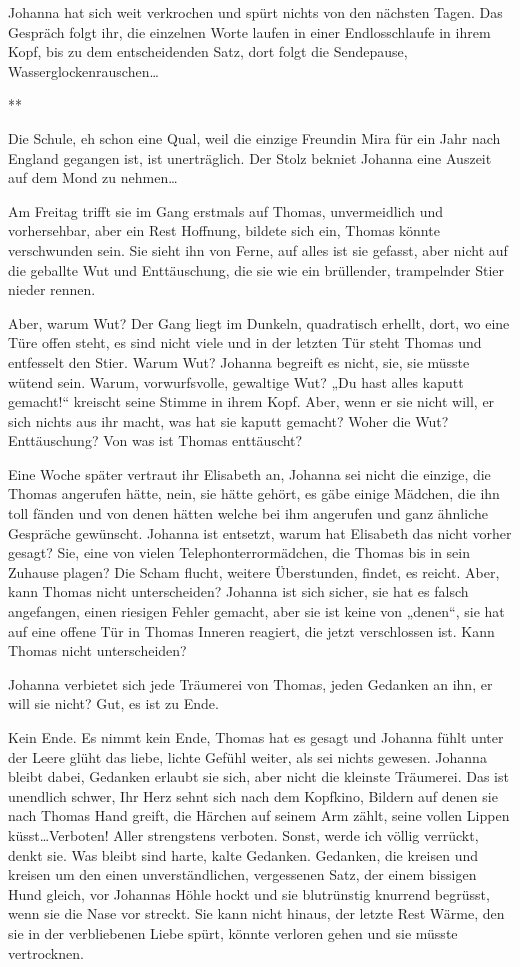 \documentclass[10pt,titlepage,a5paper]{book}
\newcommand{\sterne}{\par{\centering ***\par}}
\begin{document}
Johanna hat sich weit verkrochen und spürt nichts von den nächsten Tagen. Das Gespräch folgt ihr, die einzelnen Worte laufen in einer Endlosschlaufe in ihrem Kopf, bis zu dem entscheidenden Satz, dort folgt die Sendepause, Wasserglockenrauschen\dots 


\sterne


Die Schule, eh schon eine Qual, weil die einzige Freundin Mira für ein Jahr nach England gegangen ist, ist unerträglich. Der Stolz bekniet Johanna eine Auszeit auf dem Mond zu nehmen\dots 

Am Freitag trifft sie im Gang erstmals auf Thomas, unvermeidlich und vorhersehbar, aber ein Rest Hoffnung, bildete sich ein, Thomas könnte verschwunden sein. Sie sieht ihn von Ferne, auf alles ist sie gefasst, aber nicht auf die geballte Wut und Enttäuschung, die sie wie ein brüllender, trampelnder Stier nieder rennen. 

Aber, warum Wut? Der Gang liegt im Dunkeln, quadratisch erhellt, dort, wo eine Türe offen steht, es  sind nicht viele und in der letzten Tür steht Thomas und entfesselt den Stier. Warum Wut? Johanna begreift es nicht, sie, sie müsste wütend sein. Warum, vorwurfsvolle, gewaltige Wut? „Du hast alles kaputt gemacht!“ kreischt seine Stimme in ihrem Kopf. Aber, wenn er sie nicht will, er sich nichts aus ihr macht, was hat sie kaputt gemacht? Woher die Wut? Enttäuschung? Von was ist Thomas enttäuscht?

Eine Woche später vertraut ihr Elisabeth an, Johanna sei nicht die einzige, die Thomas angerufen hätte, nein, sie hätte gehört, es gäbe einige Mädchen, die ihn toll fänden und von denen hätten welche bei ihm angerufen und ganz ähnliche Gespräche gewünscht. Johanna ist entsetzt, warum hat Elisabeth das nicht vorher gesagt? Sie, eine von vielen Telephonterrormädchen, die Thomas bis in sein Zuhause plagen? Die Scham flucht, weitere Überstunden, findet, es reicht. Aber, kann Thomas nicht unterscheiden? Johanna ist sich sicher, sie hat es falsch angefangen, einen riesigen Fehler gemacht, aber sie ist keine von „denen“, sie hat auf eine offene Tür in Thomas Inneren reagiert, die jetzt verschlossen ist. Kann Thomas nicht unterscheiden?

Johanna verbietet sich jede Träumerei von Thomas, jeden Gedanken an ihn, er will sie nicht? Gut, es ist zu Ende.

Kein Ende. Es nimmt kein Ende, Thomas hat es gesagt und Johanna fühlt unter der Leere glüht das liebe, lichte Gefühl weiter, als sei nichts gewesen. Johanna bleibt dabei, Gedanken erlaubt sie sich, aber nicht die kleinste Träumerei. Das ist unendlich schwer, Ihr Herz sehnt sich nach dem Kopfkino, Bildern auf denen sie nach Thomas Hand greift, die Härchen auf seinem Arm zählt, seine vollen Lippen küsst\dots Verboten! Aller strengstens verboten. Sonst, werde ich völlig verrückt, denkt sie.
Was bleibt sind harte, kalte Gedanken. Gedanken, die kreisen und kreisen um den einen unverständ\-lichen, vergessenen Satz, der einem bissigen Hund gleich, vor Johannas Höhle hockt und sie blutrünstig knurrend begrüsst, wenn sie die Nase vor streckt. Sie kann nicht hinaus, der letzte Rest Wärme, den sie in der verbliebenen Liebe spürt, könnte verloren gehen und sie müsste vertrocknen.
\end{document}
